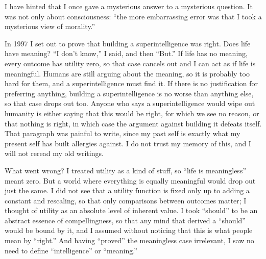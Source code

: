 
I have hinted that I once gave a mysterious answer to a mysterious question. It was not only about consciousness: ``the more embarrassing error was that I took a mysterious view of morality.'' 

In 1997 I set out to prove that building a superintelligence was right. Does life have meaning? ``I don't know,'' I said, and then ``But.'' If life has no meaning, every outcome has utility zero, so that case cancels out and I can act as if life is meaningful. Humans are still arguing about the meaning, so it is probably too hard for them, and a superintelligence must find it. If there is no justification for preferring anything, building a superintelligence is no worse than anything else, so that case drops out too. Anyone who says a superintelligence would wipe out humanity is either saying that this would be right, for which we see no reason, or that nothing is right, in which case the argument against building it defeats itself. That paragraph was painful to write, since my past self is exactly what my present self has built allergies against. I do not trust my memory of this, and I will not reread my old writings. 

What went wrong? I treated utility as a kind of stuff, so ``life is meaningless'' meant zero. But a world where everything is equally meaningful would drop out just the same.  I did not see that a utility function is fixed only up to adding a constant and rescaling, so that only comparisons between outcomes matter; I thought of utility as an absolute level of inherent value. I took ``should'' to be an abstract essence of compellingness, so that any mind that derived a ``should'' would be bound by it, and I assumed without noticing that this is what people mean by ``right.''  And having ``proved'' the meaningless case irrelevant, I saw no need to define ``intelligence'' or ``meaning.''

